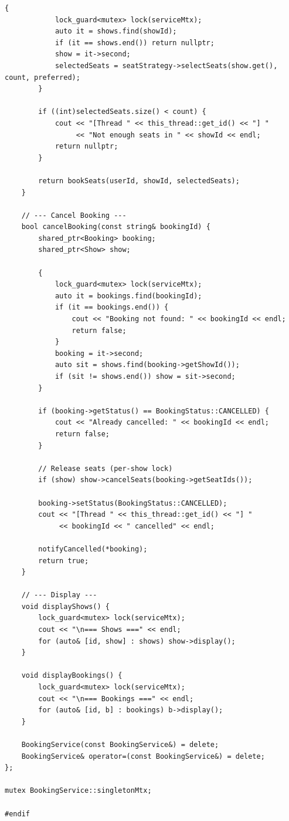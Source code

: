 \documentclass[11pt,a4paper]{article}
\begin{document}
\begin{lstlisting}[title={\texttt{managers.hpp}}]
        {
            lock_guard<mutex> lock(serviceMtx);
            auto it = shows.find(showId);
            if (it == shows.end()) return nullptr;
            show = it->second;
            selectedSeats = seatStrategy->selectSeats(show.get(), count, preferred);
        }

        if ((int)selectedSeats.size() < count) {
            cout << "[Thread " << this_thread::get_id() << "] "
                 << "Not enough seats in " << showId << endl;
            return nullptr;
        }

        return bookSeats(userId, showId, selectedSeats);
    }

    // --- Cancel Booking ---
    bool cancelBooking(const string& bookingId) {
        shared_ptr<Booking> booking;
        shared_ptr<Show> show;

        {
            lock_guard<mutex> lock(serviceMtx);
            auto it = bookings.find(bookingId);
            if (it == bookings.end()) {
                cout << "Booking not found: " << bookingId << endl;
                return false;
            }
            booking = it->second;
            auto sit = shows.find(booking->getShowId());
            if (sit != shows.end()) show = sit->second;
        }

        if (booking->getStatus() == BookingStatus::CANCELLED) {
            cout << "Already cancelled: " << bookingId << endl;
            return false;
        }

        // Release seats (per-show lock)
        if (show) show->cancelSeats(booking->getSeatIds());

        booking->setStatus(BookingStatus::CANCELLED);
        cout << "[Thread " << this_thread::get_id() << "] "
             << bookingId << " cancelled" << endl;

        notifyCancelled(*booking);
        return true;
    }

    // --- Display ---
    void displayShows() {
        lock_guard<mutex> lock(serviceMtx);
        cout << "\n=== Shows ===" << endl;
        for (auto& [id, show] : shows) show->display();
    }

    void displayBookings() {
        lock_guard<mutex> lock(serviceMtx);
        cout << "\n=== Bookings ===" << endl;
        for (auto& [id, b] : bookings) b->display();
    }

    BookingService(const BookingService&) = delete;
    BookingService& operator=(const BookingService&) = delete;
};

mutex BookingService::singletonMtx;

#endif
\end{lstlisting}
\end{document}
